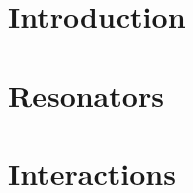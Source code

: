 \def\sz{\sigma_{0}}
\def\so{\sigma_{1}}
\def\vrel{v_\text{rel}}

\def\szX[#1]{\sigma_{0{#1}}}
\def\soX[#1]{\sigma_{1{#1}}}

\def\fs{f_\text{s}}

\def\D{\mathcal{D}}
\def\L{\mathcal{L}}
\def\O{\mathcal{O}}
\def\S{\mathcal{S}}

\def\floor[#1]{\left\lfloor #1 \right\rfloor}
\def\ceil[#1]{\left\lceil #1 \right\rceil}
\def\ansatz{\ \overset{\mathcal{A}}{\Longrightarrow}\ }
\def\qaq{\quad \text{and} \quad}
\def\mystrut{\rule[-.2\baselineskip]{0pt}{\baselineskip}}

\def\th{\textsuperscript{th} }
\def\boldPhi{\boldsymbol{\phi}}
\def\eig{\text{eig}}
\mainmatter
\part{Introduction}\label{part:introduction}


\part{Resonators}\label{part:resonators}


% 

\part{Interactions}\label{part:interactions}


% 

% 

% 

